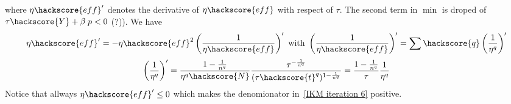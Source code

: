where $\eta\hackscore{eff}'$ denotes the derivative of $\eta\hackscore{eff}$ with respect of $\tau$. The second term in $\min$ is droped of $\tau\hackscore{Y} + \beta \; p<0$ (?)). We have
\begin{equation}
\eta\hackscore{eff}' = - \eta\hackscore{eff}^2 \left(\frac{1}{\eta\hackscore{eff}}\right)'
\mbox{ with } 
\left(\frac{1}{\eta\hackscore{eff}}\right)' = \sum\hackscore{q} \left(\frac{1}{\eta^{q}} \right)'
\label{IKM iteration 7}
\end{equation} 
\begin{equation}\label{IKM-EQU-5XX}
\left(\frac{1}{\eta^{q}} \right)'
= \frac{1-\frac{1}{n^{q}}}{\eta^{q}\hackscore{N}} \frac{\tau^{-\frac{1}{n^{q}}}}{(\tau\hackscore{t}^q)^{1-\frac{1}{n^{q}}}}
= \frac{1-\frac{1}{n^{q}}}{\tau}\frac{1}{\eta^{q}} 
\end{equation}
Notice that allways $\eta\hackscore{eff}'\le 0$ which makes the denomionator in~\ref{IKM iteration 6}
positive.



